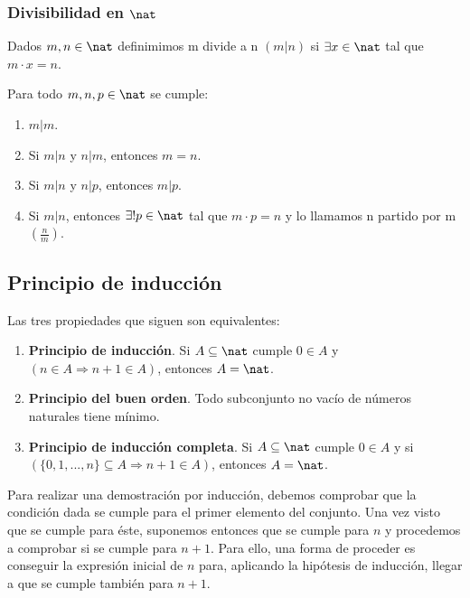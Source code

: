 \subsubsection{Divisibilidad en $\nat$}
\begin{ndef}[Divisibilidad]
    Dados $m,n \in \nat$ definimimos m divide a n $(m|n)$ si $\exists x \in \nat$ tal que $m \cdot x = n$.
\end{ndef}

\begin{properties}
    Para todo $m,n,p \in \nat$ se cumple:
    \begin{enumerate}
        \item $m|m$.
        \item Si $m|n$ y $n|m$, entonces $m = n$.
        \item Si $m|n$ y $n|p$, entonces $m|p$.
        \item Si $m|n$, entonces $\exists! p \in \nat$ tal que $m \cdot p = n$ y lo llamamos n partido por m $\left( \frac{n}{m} \right)$.
    \end{enumerate}
\end{properties}

\subsection{Principio de inducción}
\begin{nth}
    Las tres propiedades que siguen son equivalentes:
    \begin{enumerate}
        \item \textbf{Principio de inducción}. Si $A \subseteq \nat$ cumple $0 \in A$ y $(n \in A \Rightarrow n + 1 \in A)$, entonces $A = \nat$.
        \item \textbf{Principio del buen orden}. Todo subconjunto no vacío de números naturales tiene mínimo.
        \item \textbf{Principio de inducción completa}. Si $A \subseteq \nat$ cumple $0 \in A$ y si $(\{0,1,...,n\} \subseteq A \Rightarrow n + 1 \in A)$, entonces $A = \nat$.
    \end{enumerate}
\end{nth}
\begin{nota}
Para realizar una demostración por inducción, debemos comprobar que la condición dada se cumple para el primer elemento del conjunto. Una vez visto que se cumple para éste,
suponemos entonces que se cumple para $n$ y procedemos a comprobar si se cumple para $n+1$. Para ello, una forma de proceder es conseguir la expresión inicial de $n$ para, aplicando
la hipótesis de inducción, llegar a que se cumple también para $n+1$.
\end{nota}

